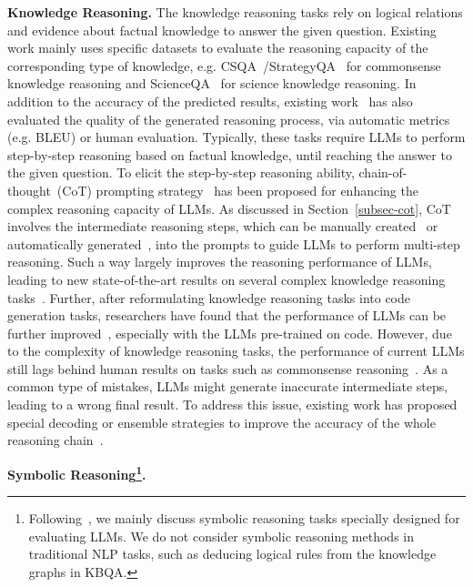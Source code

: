 {{{{\textbf{Knowledge Reasoning.} The knowledge reasoning tasks rely on logical relations and evidence about factual knowledge to answer the given question. Existing work mainly uses specific datasets to evaluate the reasoning capacity of the corresponding type of knowledge, e.g. CSQA~\cite{Talmor-naacl-2019-CommonsenseQA}/StrategyQA~\cite{Geva-tacl-2021-Did} for commonsense knowledge reasoning and ScienceQA~\cite{Saikh-IJDL-2022-ScienceQA} for science knowledge reasoning. {In addition to the accuracy of the predicted results, existing work~\cite{Saikh-IJDL-2022-ScienceQA} has  also evaluated the quality of the generated reasoning process, via automatic metrics (e.g. BLEU) or human evaluation.} Typically, these tasks require LLMs to perform step-by-step reasoning based on factual knowledge, until reaching the answer to the given question. To elicit the {step-by-step reasoning} ability, chain-of-thought~(CoT) prompting strategy~\cite{Wei-arxiv-2022-chain} has been proposed for enhancing the complex reasoning capacity of LLMs. As discussed in Section~\ref{subsec-cot}, CoT involves the intermediate reasoning steps, which can be manually created~\cite{Wei-arxiv-2022-chain} or automatically generated~\cite{Shao-arxiv-2023-Synthetic}, into the prompts to guide LLMs to perform multi-step reasoning. Such a way largely improves the reasoning performance of LLMs, leading to new state-of-the-art results on several complex knowledge reasoning tasks~\cite{Wei-arxiv-2022-chain,Chowdhery-arxiv-2022-PaLM,Ning-arxiv-2023-ChatGPT}. Further, after reformulating knowledge reasoning tasks into code generation tasks, researchers have found that the performance of LLMs can be further improved~\cite{Madaan-emnlp-2022-Language}, especially with the LLMs pre-trained on code. {However, due to the complexity of knowledge reasoning tasks, the  performance  of current LLMs still lags behind human results on tasks such as commonsense reasoning~\cite{Wei-arxiv-2022-chain,Chowdhery-arxiv-2022-PaLM,Sifatkaur-arxiv-2023-Mind}.} As a common type of   mistakes, LLMs might generate inaccurate  {intermediate steps},  leading to a wrong final result. To address this issue, existing work has proposed special decoding or ensemble strategies to improve the accuracy of the whole reasoning chain~\cite{Wang-arxiv-2022-Self-Consistency,Li-arxiv-2022-On}. 

\textbf{Symbolic Reasoning\footnote{{Following~\cite{Wei-arxiv-2022-chain}, we mainly discuss symbolic reasoning tasks specially designed for evaluating LLMs. We do not consider symbolic reasoning methods in traditional NLP tasks, such as deducing logical rules from the knowledge graphs in KBQA.}}.}  

}}}}
